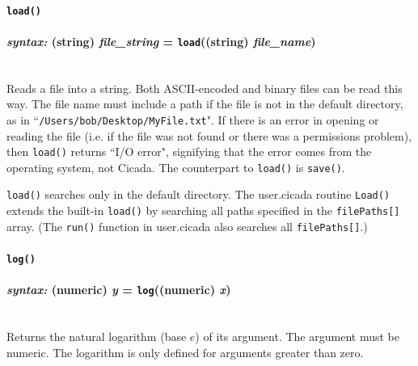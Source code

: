 \documentclass{article}
\begin{document}

\paragraph{\texttt{load()}\\\\
\normalfont \emph{syntax: } (string) \emph{file\_string} = \texttt{load}((string) \emph{file\_name})\\\\}
 

Reads a file into a string.  Both ASCII-encoded and binary files can be read this way.  The file name must include a path if the file is not in the default directory, as in ``\texttt{/Users/bob/Desktop/MyFile.txt}".  If there is an error in opening or reading the file (i.e. if the file was not found or there was a permissions problem), then \texttt{load()} returns ``I/O error", signifying that the error comes from the operating system, not Cicada.  The counterpart to \texttt{load()} is \texttt{save()}.

\texttt{load()} searches only in the default directory.  The user.cicada routine \texttt{Load()} extends the built-in \texttt{load()} by searching all paths specified in the \texttt{filePaths[]} array.  (The \texttt{run()} function in user.cicada also searches all \texttt{filePaths[]}.)\\

 





\paragraph{\texttt{log()}\\\\
\normalfont \emph{syntax: } (numeric) \emph{y} = \texttt{log}((numeric) \emph{x})\\\\}

Returns the natural logarithm (base $e$) of its argument.  The argument must be numeric.  The logarithm is only defined for arguments greater than zero.\\





\end{document}
